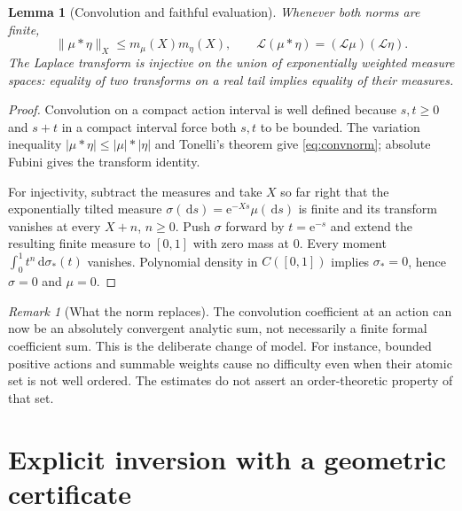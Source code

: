 \documentclass[11pt,a4paper]{article}
\newtheorem{lemma}[theorem]{Lemma}
\theoremstyle{definition}
\theoremstyle{remark}
\newtheorem{remark}[theorem]{Remark}
\newcommand{\Lap}{\mathcal L}
\newcommand{\dd}{\,\mathrm d}
\newcommand{\e}{\mathrm e}
\newcommand{\normx}[2]{\lVert #1\rVert_{#2}}
\numberwithin{equation}{section}
\begin{document}
\begin{lemma}[Convolution and faithful evaluation]\label{lem:convolution}
Whenever both norms are finite,
\begin{equation}\label{eq:convnorm}
 \normx{\mu*\eta}{X}\le m_\mu(X)m_\eta(X),
 \qquad \Lap(\mu*\eta)=(\Lap\mu)(\Lap\eta).
\end{equation}
The Laplace transform is injective on the union of exponentially weighted measure spaces: equality of two transforms on a real tail implies equality of their measures.
\end{lemma}
\begin{proof}
Convolution on a compact action interval is well defined because $s,t\ge0$ and $s+t$ in a compact interval force both $s,t$ to be bounded. The variation inequality $|\mu*\eta|\le|\mu|*|\eta|$ and Tonelli's theorem give \eqref{eq:convnorm}; absolute Fubini gives the transform identity.

For injectivity, subtract the measures and take $X$ so far right that the exponentially tilted measure $\sigma(\dd s)=\e^{-Xs}\mu(\dd s)$ is finite and its transform vanishes at every $X+n$, $n\ge0$. Push $\sigma$ forward by $t=\e^{-s}$ and extend the resulting finite measure to $[0,1]$ with zero mass at $0$. Every moment $\int_0^1 t^n\dd\sigma_*(t)$ vanishes. Polynomial density in $C([0,1])$ implies $\sigma_*=0$, hence $\sigma=0$ and $\mu=0$.
\end{proof}

\begin{remark}[What the norm replaces]
The convolution coefficient at an action can now be an absolutely convergent analytic sum, not necessarily a finite formal coefficient sum. This is the deliberate change of model. For instance, bounded positive actions and summable weights cause no difficulty even when their atomic set is not well ordered. The estimates do not assert an order-theoretic property of that set.
\end{remark}

\section{Explicit inversion with a geometric certificate}\label{sec:inverse}
\end{document}
